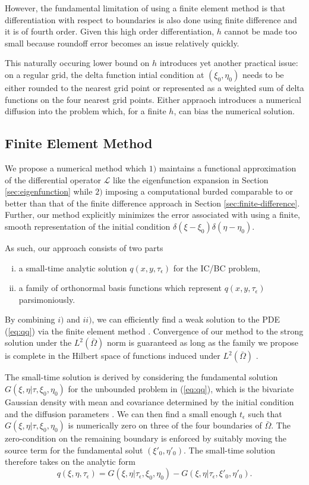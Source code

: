 \documentclass[10pt]{article}
\begin{document}
However, the fundamental limitation of using a finite element method
is that differentiation with respect to boundaries is also done using
finite difference and it is of fourth order. Given this high order
differentiation, $h$ cannot be made too small because roundoff error
becomes an issue relatively quickly.

This naturally occuring lower bound on $h$ introduces yet another
practical issue: on a regular grid, the delta function intial
condition at $(\xi_0, \eta_0)$ needs to be either rounded to the
nearest grid point or represented as a weighted sum of delta functions
on the four nearest grid points. Either appraoch introduces a
numerical diffusion into the problem which, for a finite $h$, can bias
the numerical solution.

\subsection{Finite Element Method}
We propose a numerical method which $1)$ maintains a functional
approximation of the differential operator $\mathcal{L}$ like the
eigenfunction expansion in Section \ref{sec:eigenfunction} while $2)$
imposing a computational burded comparable to or better than that of
the finite difference approach in Section
\ref{sec:finite-difference}. Further, our method explicitly minimizes
the error associated with using a finite, smooth representation of the
initial condition $\delta(\xi-\xi_0)\delta(\eta-\eta_0)$.

As such, our approach consists of two parts
\begin{enumerate}[i)]
\item a small-time analytic solution $q(x,y,\tau_\epsilon)$ for the IC/BC problem,
\item a family of orthonormal basis functions which represent
  $q(x,y,\tau_\epsilon)$ parsimoniously.
\end{enumerate}
By combining $i)$ and $ii)$, we can efficiently find a weak solution to the
PDE (\ref{eq:qq}) via the finite element method
\citep{shaidurov2013multigrid}. Convergence of our method to the
strong solution under the $L^2(\bar{\Omega})$ norm is guaranteed as
long as the family we propose is complete in the Hilbert space of
functions induced under $L^2(\bar{\Omega})$ \citep{salsa2016partial}.

The small-time solution is derived by considering the fundamental
solution $G(\xi,\eta |\tau, \xi_0, \eta_0)$ for the unbounded problem
in (\ref{eq:qq}), which is the bivariate Gaussian density with mean
and covariance determined by the initial condition and the diffusion
parameters \citep{stakgold2011green}. We can then find a small enough
$t_\epsilon$ such that $G(\xi,\eta |\tau, \xi_0, \eta_0)$ is
numerically zero on three of the four boundaries of
$\bar{\Omega}$. The zero-condition on the remaining boundary is
enforced by suitably moving the source term for the fundamental solut
$(\xi'_0, \eta'_0)$. The small-time solution
therefore takes on the analytic form
\[
  q(\xi,\eta,\tau_\epsilon) = G(\xi,\eta|\tau_\epsilon,\xi_0, \eta_0) - G(\xi,\eta|\tau_\epsilon,\xi'_0, \eta'_0).
\]
\end{document}
